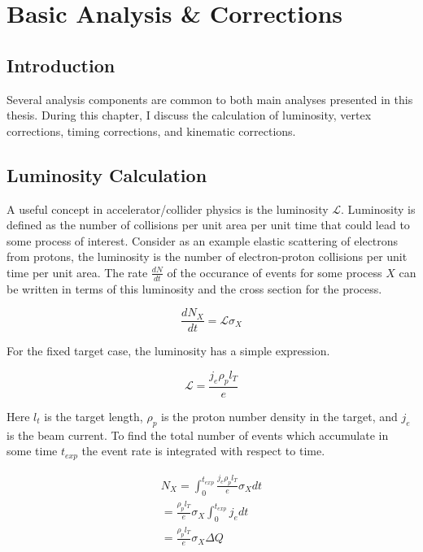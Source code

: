 \chapter{Basic Analysis \& Corrections}

\section{Introduction}
Several analysis components are common to both main analyses presented in this thesis.  During this chapter, I discuss the calculation of luminosity, vertex corrections, timing corrections, and kinematic corrections.  

\section{Luminosity Calculation}
A useful concept in accelerator/collider physics is the luminosity $\mathcal{L}$.  Luminosity is defined as the number of collisions per unit area per unit time that could lead to some process of interest.  Consider as an example elastic scattering of electrons from protons, the luminosity is the number of electron-proton collisions per unit time per unit area.  The rate $\frac{dN}{dt}$ of the occurance of events for some process $X$ can be written in terms of this luminosity and the cross section for the process.

\begin{equation}
	\frac{dN_X}{dt} = \mathcal{L} \sigma_X 
\end{equation}

For the fixed target case, the luminosity has a simple expression.

\begin{equation}
	\mathcal{L} = \frac{j_e \rho_p l_T}{e} 
\end{equation}

Here $l_t$ is the target length, $\rho_p$ is the proton number density in the target, and $j_e$ is the beam current. To find the total number of events which accumulate in some time $t_{exp}$ the event rate is integrated with respect to time.

\begin{align}
	N_X = \int_{0}^{t_{exp}} \frac{j_e \rho_p l_T}{e} \sigma_X dt \\
	= \frac{\rho_p l_T}{e} \sigma_X \int_{0}^{t_{exp}} j_e dt \\
	=  \frac{\rho_p l_T}{e} \sigma_X \Delta Q
\end{align}

